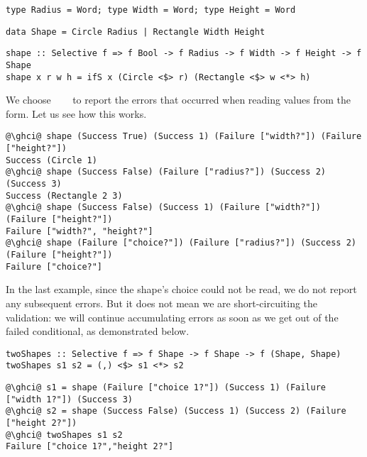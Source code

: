 {\vspace{1mm}
\begin{verbatim}
type Radius = Word; type Width = Word; type Height = Word
\end{verbatim}
\vspace{1mm}
\begin{verbatim}
data Shape = Circle Radius | Rectangle Width Height
\end{verbatim}
\vspace{1mm}
\begin{verbatim}
shape :: Selective f => f Bool -> f Radius -> f Width -> f Height -> f Shape
shape x r w h = ifS x (Circle <$> r) (Rectangle <$> w <*> h)
\end{verbatim}
\vspace{1mm}

\noindent
We choose ~\hs{=}~~\hs{[String]} to report the errors that
occurred when reading values from the form. Let us see how this works.

\vspace{1mm}
\begin{verbatim}
@\ghci@ shape (Success True) (Success 1) (Failure ["width?"]) (Failure ["height?"])
Success (Circle 1)
@\ghci@ shape (Success False) (Failure ["radius?"]) (Success 2) (Success 3)
Success (Rectangle 2 3)
@\ghci@ shape (Success False) (Success 1) (Failure ["width?"]) (Failure ["height?"])
Failure ["width?", "height?"]
@\ghci@ shape (Failure ["choice?"]) (Failure ["radius?"]) (Success 2) (Failure ["height?"])
Failure ["choice?"]
\end{verbatim}
\vspace{1mm}

\noindent
In the last example, since the shape's choice could not be read, we do not
report any subsequent errors. But it does not mean we are short-circuiting the
validation: we will continue accumulating errors as soon as we get out of the
failed conditional, as demonstrated below.

\vspace{1mm}
\begin{verbatim}
twoShapes :: Selective f => f Shape -> f Shape -> f (Shape, Shape)
twoShapes s1 s2 = (,) <$> s1 <*> s2
\end{verbatim}
\vspace{1mm}
\begin{verbatim}
@\ghci@ s1 = shape (Failure ["choice 1?"]) (Success 1) (Failure ["width 1?"]) (Success 3)
@\ghci@ s2 = shape (Success False) (Success 1) (Success 2) (Failure ["height 2?"])
@\ghci@ twoShapes s1 s2
Failure ["choice 1?","height 2?"]
\end{verbatim}
\vspace{1mm}

}
